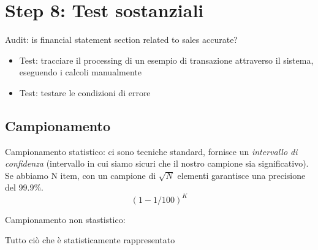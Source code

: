 \section{Step 8: Test sostanziali}

Audit: is financial statement section related to sales accurate? 

\begin{itemize}
\item Test: tracciare il processing di un esempio di transazione attraverso il 
sistema, eseguendo i calcoli manualmente
\item Test: testare le condizioni di errore
\end{itemize}



\subsection{Campionamento}

Campionamento statistico: ci sono tecniche standard, fornisce un 
\textit{intervallo di confidenza} (intervallo in cui siamo sicuri che il nostro 
campione sia significativo). Se abbiamo N item, con un campione di $\sqrt{N}$ 
elementi garantisce una precisione del 99.9\%.
$$
(1 - 1/100)^K
$$

Campionamento non stastistico:

Tutto ciò che è statisticamente rappresentato

